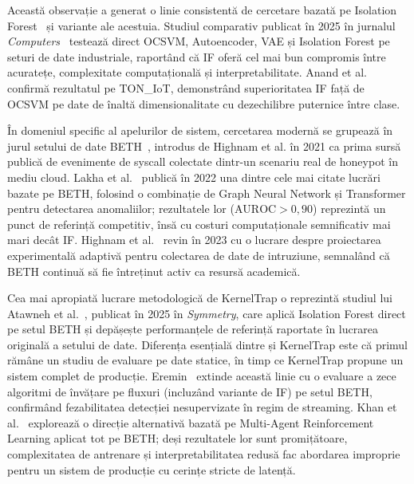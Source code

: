 Această observație a generat o linie consistentă de cercetare bazată pe
Isolation Forest~\cite{liu2008iforest} și variante ale acestuia.
Studiul comparativ publicat în 2025 în jurnalul
\textit{Computers}~\cite{oneclass2025survey} testează direct OCSVM, Autoencoder,
VAE și Isolation Forest pe seturi de date industriale, raportând că IF oferă
cel mai bun compromis între acuratețe, complexitate computațională și
interpretabilitate.
Anand et al.~\cite{anand2025iot} confirmă rezultatul pe TON\_IoT, demonstrând
superioritatea IF față de OCSVM pe date de înaltă dimensionalitate cu
dezechilibre puternice între clase.

În domeniul specific al apelurilor de sistem, cercetarea modernă se grupează în
jurul setului de date BETH~\cite{highnam2021beth}, introdus de Highnam et al.
în 2021 ca prima sursă publică de evenimente de syscall colectate dintr-un
scenariu real de honeypot în mediu cloud.
Lakha et al.~\cite{lakha2022beth} publică în 2022 una dintre cele mai citate
lucrări bazate pe BETH, folosind o combinație de Graph Neural Network și
Transformer pentru detectarea anomaliilor; rezultatele lor
($\text{AUROC} > 0{,}90$) reprezintă un punct de referință competitiv, însă cu
costuri computaționale semnificativ mai mari decât IF.
Highnam et al.~\cite{highnam2023adaptive} revin în 2023 cu o lucrare despre
proiectarea experimentală adaptivă pentru colectarea de date de intruziune,
semnalând că BETH continuă să fie întreținut activ ca resursă academică.

Cea mai apropiată lucrare metodologică de KernelTrap o reprezintă studiul lui
Atawneh et al.~\cite{atawneh2025symmetry}, publicat în 2025 în
\textit{Symmetry}, care aplică Isolation Forest direct pe setul BETH și
depășește performanțele de referință raportate în lucrarea originală a setului
de date.
Diferența esențială dintre \cite{atawneh2025symmetry} și KernelTrap este că
primul rămâne un studiu de evaluare pe date statice, în timp ce KernelTrap
propune un sistem complet de producție.
Eremin~\cite{eremin2025streams} extinde această linie cu o evaluare a zece
algoritmi de învățare pe fluxuri (incluzând variante de IF) pe setul BETH,
confirmând fezabilitatea detecției nesupervizate în regim de streaming.
Khan et al.~\cite{khan2025marl} explorează o direcție alternativă bazată pe
Multi-Agent Reinforcement Learning aplicat tot pe BETH; deși rezultatele lor
sunt promițătoare, complexitatea de antrenare și interpretabilitatea redusă fac
abordarea improprie pentru un sistem de producție cu cerințe stricte de latență.

